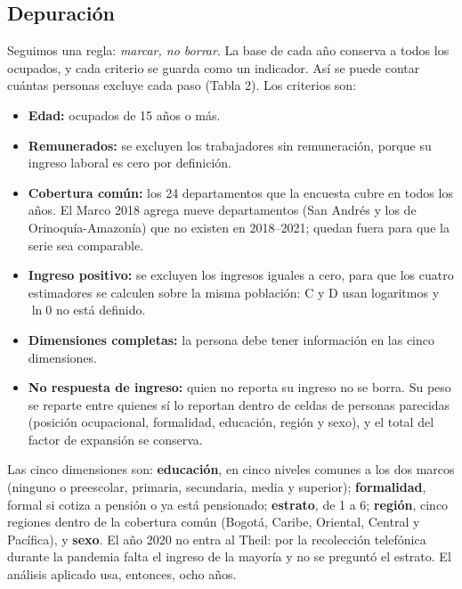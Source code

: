\documentclass[12pt,letterpaper]{article}
\begin{document}
\subsection{Depuración}

Seguimos una regla: \emph{marcar, no borrar}. La base de cada año conserva a todos los ocupados, y cada criterio se guarda como un indicador. Así se puede contar cuántas personas excluye cada paso (Tabla 2). Los criterios son:

\begin{itemize}[leftmargin=0.75in]
  \item \textbf{Edad:} ocupados de 15 años o más.
  \item \textbf{Remunerados:} se excluyen los trabajadores sin remuneración, porque su ingreso laboral es cero por definición.
  \item \textbf{Cobertura común:} los 24 departamentos que la encuesta cubre en todos los años. El Marco 2018 agrega nueve departamentos (San Andrés y los de Orinoquía-Amazonía) que no existen en 2018--2021; quedan fuera para que la serie sea comparable.
  \item \textbf{Ingreso positivo:} se excluyen los ingresos iguales a cero, para que los cuatro estimadores se calculen sobre la misma población: C y D usan logaritmos y $\ln 0$ no está definido.
  \item \textbf{Dimensiones completas:} la persona debe tener información en las cinco dimensiones.
  \item \textbf{No respuesta de ingreso:} quien no reporta su ingreso no se borra. Su peso se reparte entre quienes sí lo reportan dentro de celdas de personas parecidas (posición ocupacional, formalidad, educación, región y sexo), y el total del factor de expansión se conserva.
\end{itemize}

Las cinco dimensiones son: \textbf{educación}, en cinco niveles comunes a los dos marcos (ninguno o preescolar, primaria, secundaria, media y superior); \textbf{formalidad}, formal si cotiza a pensión o ya está pensionado; \textbf{estrato}, de 1 a 6; \textbf{región}, cinco regiones dentro de la cobertura común (Bogotá, Caribe, Oriental, Central y Pacífica), y \textbf{sexo}. El año 2020 no entra al Theil: por la recolección telefónica durante la pandemia falta el ingreso de la mayoría y no se preguntó el estrato. El análisis aplicado usa, entonces, ocho años.
\end{document}
